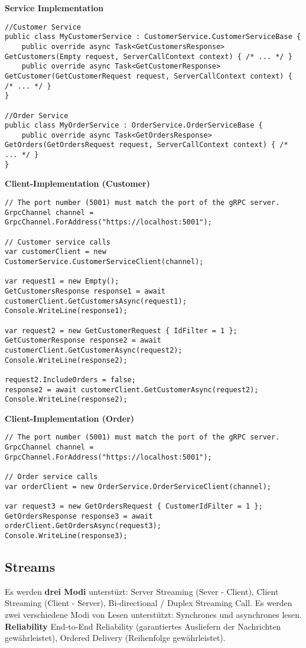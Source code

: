 \textbf{Service Implementation} \\
\begin{lstlisting}
//Customer Service
public class MyCustomerService : CustomerService.CustomerServiceBase {
    public override async Task<GetCustomersResponse> GetCustomers(Empty request, ServerCallContext context) { /* ... */ }
    public override async Task<GetCustomerResponse> GetCustomer(GetCustomerRequest request, ServerCallContext context) { /* ... */ }
}

//Order Service
public class MyOrderService : OrderService.OrderServiceBase {
    public override async Task<GetOrdersResponse> GetOrders(GetOrdersRequest request, ServerCallContext context) { /* ... */ }
}
\end{lstlisting}

\textbf{Client-Implementation (Customer)}
\begin{lstlisting}
// The port number (5001) must match the port of the gRPC server.
GrpcChannel channel = GrpcChannel.ForAddress("https://localhost:5001");

// Customer service calls
var customerClient = new CustomerService.CustomerServiceClient(channel);

var request1 = new Empty();
GetCustomersResponse response1 = await customerClient.GetCustomersAsync(request1);
Console.WriteLine(response1);

var request2 = new GetCustomerRequest { IdFilter = 1 };
GetCustomerResponse response2 = await customerClient.GetCustomerAsync(request2);
Console.WriteLine(response2);

request2.IncludeOrders = false;
response2 = await customerClient.GetCustomerAsync(request2);
Console.WriteLine(response2);
\end{lstlisting}

\textbf{Client-Implementation (Order)}
\begin{lstlisting}
// The port number (5001) must match the port of the gRPC server.
GrpcChannel channel = GrpcChannel.ForAddress("https://localhost:5001");

// Order service calls
var orderClient = new OrderService.OrderServiceClient(channel);

var request3 = new GetOrdersRequest { CustomerIdFilter = 1 };
GetOrdersResponse response3 = await orderClient.GetOrdersAsync(request3);
Console.WriteLine(response3);
\end{lstlisting}


\subsection{Streams}
Es werden \textbf{drei Modi} unterstüzt: Server Streaming (Sever - Client), Client Streaming (Client - Server), Bi-directional / Duplex Streaming Call. Es werden zwei verschiedene Modi von Lesen unterstützt: Synchrones und asynchrones lesen. \textbf{Reliability} End-to-End Reliability (garantiertes Ausliefern der Nachrichten gewährleistet), Ordered Delivery (Reihenfolge gewährleistet).


